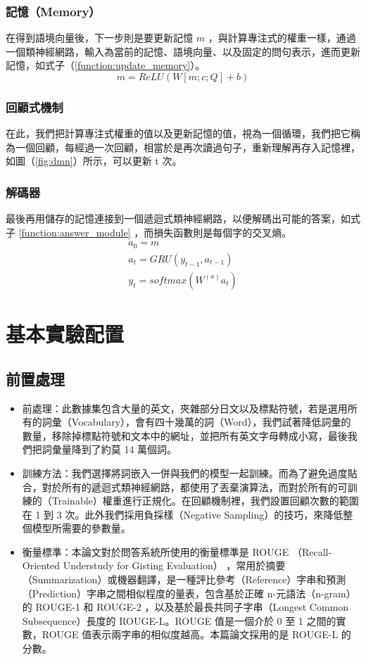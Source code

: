 \subsubsection{記憶（Memory）}
在得到語境向量後，下一步則是要更新記憶 $m$ ，與計算專注式的權重一樣，通過一個類神經網路，輸入為當前的記憶、語境向量、以及固定的問句表示，進而更新記憶，如式子（\ref{function:update_memory}）。
\begin{equation}
    m = ReLU(W [m; c; Q] +b) \label{function:update_memory}
\end{equation}
\subsubsection{回顧式機制}
在此，我們把計算專注式權重的值以及更新記憶的值，視為一個循環，我們把它稱為一個回顧，每經過一次回顧，相當於是再次讀過句子，重新理解再存入記憶裡，如圖（\ref{fig:dmn}）所示，可以更新 t 次。
\subsubsection{解碼器}
最後再用儲存的記憶連接到一個遞迴式類神經網路，以便解碼出可能的答案，如式子 \ref{function:answer_module} ，而損失函數則是每個字的交叉熵。
\begin{equation}
    \label{function:answer_module}
    \begin{aligned}
    a_0 = m \\
    a_t = GRU(y_{t-1}, a_{t-1}) \\
    y_t = softmax(W^{(a)} a_t)
    \end{aligned}
\end{equation}

\section{基本實驗配置}
\subsection{前置處理}
\itemsep -4pt
\begin{itemize}
    \item 前處理：此數據集包含大量的英文，夾雜部分日文以及標點符號，若是選用所有的詞彙（Vocabulary），會有四十幾萬的詞（Word），我們試著降低詞彙的數量，移除掉標點符號和文本中的網址，並把所有英文字母轉成小寫，最後我們把詞彙量降到了約莫 14 萬個詞。
    \item 訓練方法：我們選擇將詞嵌入一併與我們的模型一起訓練。而為了避免過度貼合，對於所有的遞迴式類神經網路，都使用了丟棄演算法，而對於所有的可訓練的（Trainable）權重進行正規化。在回顧機制裡，我們設置回顧次數的範圍在 1 到 3 次。此外我們採用負採樣（Negative Sampling）的技巧，來降低整個模型所需要的參數量。
    \item 衡量標準：本論文對於問答系統所使用的衡量標準是 ROUGE （Recall-Oriented Understudy for Gisting Evaluation）\cite{lin2004rouge} ，常用於摘要（Summarization）或機器翻譯，是一種評比參考（Reference）字串和預測（Prediction）字串之間相似程度的量表，包含基於正確 n-元語法（n-gram）的 ROUGE-1 和 ROUGE-2 ，以及基於最長共同子字串（Longest Common Subsequence）長度的 ROUGE-L。ROUGE 值是一個介於 0 至 1 之間的實數，ROUGE 值表示兩字串的相似度越高。本篇論文採用的是 ROUGE-L 的分數。

\end{itemize}
